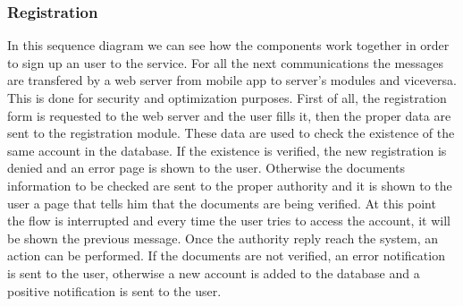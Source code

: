 \documentclass[english]{article}
\begin{document}
		\subsubsection{Registration}
		In this sequence diagram we can see how the components work together in order to sign up an user to the service.
		For all the next communications the messages are transfered by a web server from mobile app to server's modules and viceversa. This is done for security and optimization purposes.
		First of all, the registration form is requested to the web server and the user fills it, then the proper data are sent to the registration module.
		These data are used to check the existence of the same account in the database.
		If the existence is verified, the new registration is denied and an error page is shown to the user. Otherwise the documents information to be checked are sent to the proper authority and it is shown to the user a page that tells him that the documents are being verified. At this point the flow is interrupted and every time the user tries to access the account, it will be shown the previous message.
		Once the authority reply reach the system, an action can be performed. If the documents are not verified, an error notification is sent to the user, otherwise a new account is added to the database and a positive notification is sent to the user.
\end{document}
